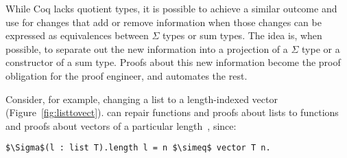 While Coq lacks quotient types,
it is possible to achieve a similar outcome and use \toolname for changes that add or remove information
when those changes can be expressed as equivalences between $\Sigma$ types or sum types.
The idea is, when possible, to separate out the new information
into a projection of a $\Sigma$ type or a constructor of a sum type.
Proofs about this new information become the proof obligation for the proof engineer,
and \toolname automates the rest.

Consider, for example, changing a list to a length-indexed vector (Figure~\ref{fig:listtovect}).
\toolname can repair functions and proofs about lists to functions and proofs about vectors of a particular length~, %
since:

\begin{lstlisting}
$\Sigma$(l : list T).length l = n $\simeq$ vector T n.
\end{lstlisting}
%
%
%
%
%
%
